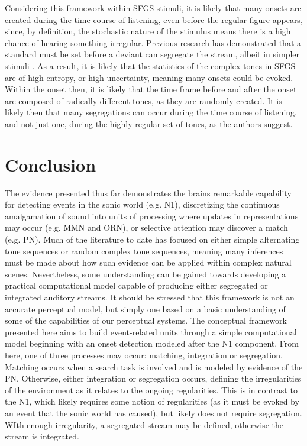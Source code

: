 \documentclass[a4paper,10pt,final]{ThesisStyle}
\begin{document}
Considering this framework within SFGS stimuli, it is likely that many onsets are created during the time course of listening, even before the regular figure appears, since, by definition, the stochastic nature of the stimulus means there is a high chance of hearing something irregular.  Previous research has demonstrated that a standard must be set before a deviant can segregate the stream, albeit in simpler stimuli \cite{Cowan1988}.  As a result, it is likely that the statistics of the complex tones in SFGS are of high entropy, or high uncertainty, meaning many onsets could be evoked.  Within the onset then, it is likely that the time frame before and after the onset are composed of radically different tones, as they are randomly created.  It is likely then that many segregations can occur during the time course of listening, and not just one, during the highly regular set of tones, as the authors suggest.  


\section{Conclusion}

The evidence presented thus far demonstrates the brains remarkable capability for detecting events in the sonic world (e.g. N1), discretizing the continuous amalgamation of sound into units of processing where updates in representations may occur (e.g. MMN and ORN), or selective attention may discover a match (e.g. PN).  Much of the literature to date has focused on either simple alternating tone sequences or random complex tone sequences, meaning many inferences must be made about how such evidence can be applied within complex natural scenes.  Nevertheless, some understanding can be gained towards developing a practical computational model capable of producing either segregated or integrated auditory streams.  It should be stressed that this framework is not an accurate perceptual model, but simply one based on a basic understanding of some of the capabilities of our perceptual systems.  The conceptual framework presented here aims to build event-related units through a simple computational model beginning with an onset detection modeled after the N1 component.  From here, one of three processes may occur: matching, integration or segregation.  Matching occurs when a search task is involved and is modeled by evidence of the PN.  Otherwise, either integration or segregation occurs, defining the irregularities of the environment as it relates to the ongoing regularities.  This is in contrast to the N1, which likely requires some notion of regularities (as it must be evoked by an event that the sonic world has caused), but likely does not require segregation. WIth enough irregularity, a segregated stream may be defined, otherwise the stream is integrated.  
\end{document}
